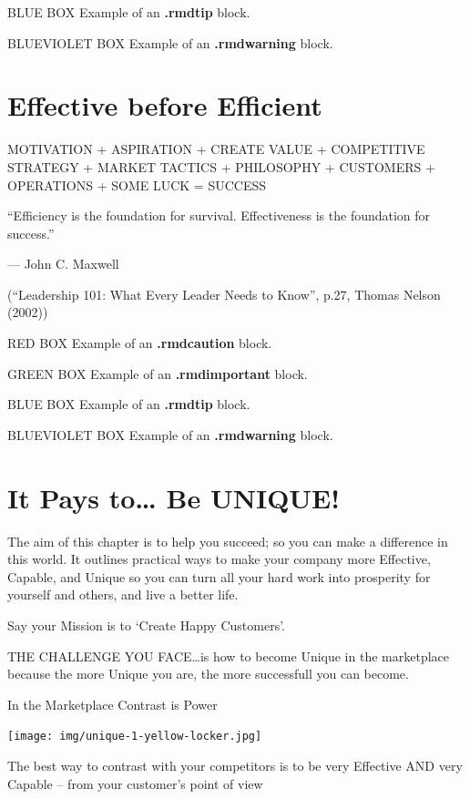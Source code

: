 \documentclass[
]{book}
\begin{document}
BLUE BOX Example of an \textbf{.rmdtip} block.

BLUEVIOLET BOX Example of an \textbf{.rmdwarning} block.

\hypertarget{effective-before-efficient}{%
\chapter{Effective before Efficient}\label{effective-before-efficient}}

{MOTIVATION}
{+}
{ASPIRATION}
{+}
{CREATE VALUE}
{+}
{COMPETITIVE STRATEGY }
{+}
{MARKET TACTICS}
{+}
{PHILOSOPHY}
{+}
{CUSTOMERS}
{+}
{OPERATIONS}
{+}
{SOME LUCK}
{=}
{SUCCESS}

``Efficiency is the foundation for survival. Effectiveness is the foundation for success.''

--- John C. Maxwell

(``Leadership 101: What Every Leader Needs to Know'', p.27, Thomas Nelson (2002))

RED BOX Example of an \textbf{.rmdcaution} block.

GREEN BOX Example of an \textbf{.rmdimportant} block.

BLUE BOX Example of an \textbf{.rmdtip} block.

BLUEVIOLET BOX Example of an \textbf{.rmdwarning} block.

\hypertarget{it-pays-to-be-unique}{%
\chapter{It Pays to\ldots{} Be UNIQUE!}\label{it-pays-to-be-unique}}

The aim of this chapter is to help you succeed; so you can make a difference in this world. It outlines practical ways to make your company more Effective, Capable, and Unique so you can turn all your hard work into prosperity for yourself and others, and live a better life.

Say your Mission is to `Create Happy Customers'.

THE CHALLENGE YOU FACE\ldots is how to become Unique in the marketplace because the more Unique you are, the more successfull you can become.

In the Marketplace Contrast is Power

\texttt{[image: img/unique-1-yellow-locker.jpg]}

The best way to contrast with your competitors is to be very Effective AND very Capable -- from your customer's point of view
\end{document}
